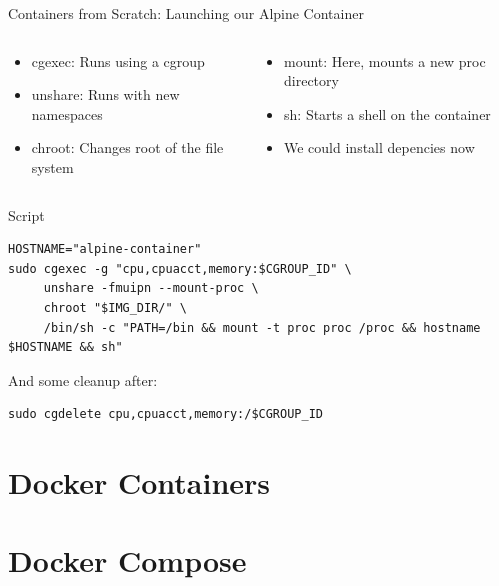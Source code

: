 \documentclass[10pt, compress, aspectratio=169, xcolor={table,usenames,dvipsnames}]{beamer}
\begin{document}
\begin{frame}[label={sec:org7982afc},fragile]{Containers from Scratch: Launching our Alpine Container}
 \begin{columns}
\begin{column}{0.5\columnwidth}
\begin{itemize}
\item \alert{cgexec}: Runs using a cgroup
\item \alert{unshare}: Runs with new \alert{namespaces}
\item \alert{chroot}: Changes \alert{root} of the file system
\end{itemize}
\end{column}
\begin{column}{0.5\columnwidth}
\begin{itemize}
\item \alert{mount}: Here, mounts a new \alert{proc} directory
\item \alert{sh}: Starts a shell on the \alert{container}
\item We could install \alert{depencies} now
\end{itemize}
\end{column}
\end{columns}

\begin{block}{Script}
\lstset{language=bash,label= ,caption= ,captionpos=b,numbers=none}
\begin{lstlisting}
HOSTNAME="alpine-container"
sudo cgexec -g "cpu,cpuacct,memory:$CGROUP_ID" \
     unshare -fmuipn --mount-proc \
     chroot "$IMG_DIR/" \
     /bin/sh -c "PATH=/bin && mount -t proc proc /proc && hostname $HOSTNAME && sh"

\end{lstlisting}

And some \alert{cleanup} after:

\lstset{language=bash,label= ,caption= ,captionpos=b,numbers=none}
\begin{lstlisting}
sudo cgdelete cpu,cpuacct,memory:/$CGROUP_ID
\end{lstlisting}
\end{block}
\end{frame}


\section{Docker Containers}
\label{sec:org36e6c68}
\section{Docker Compose}
\label{sec:org40332e5}
\end{document}
